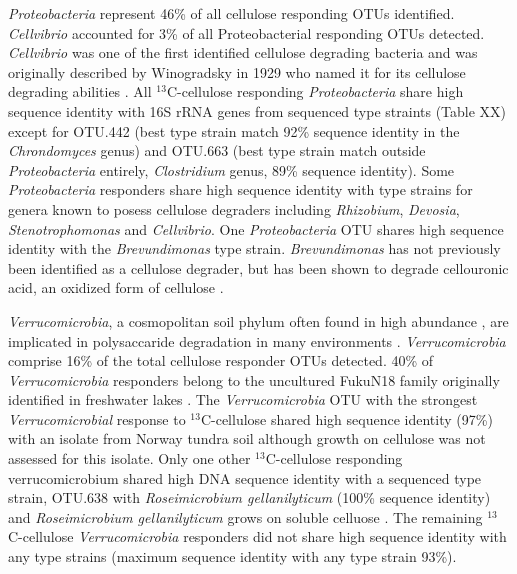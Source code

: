 \textit{Proteobacteria} represent 46\% of all cellulose responding OTUs
identified. \textit{Cellvibrio} accounted for 3\% of all Proteobacterial
responding OTUs detected. \textit{Cellvibrio} was one of the first identified
cellulose degrading bacteria and was originally described by Winogradsky in
1929 who named it for its cellulose degrading abilities
\citep{boone2001bergeys}. All $^{13}$C-cellulose responding
\textit{Proteobacteria} share high sequence identity with 16S rRNA genes from
sequenced type straints (Table XX) except for OTU.442 (best type strain match
92\% sequence identity in the \textit{Chrondomyces} genus) and OTU.663 (best
type strain match outside \textit{Proteobacteria} entirely,
\textit{Clostridium} genus, 89\% sequence identity). Some
\textit{Proteobacteria} responders share high sequence identity with type
strains for genera known to posess cellulose degraders including
\textit{Rhizobium}, \textit{Devosia}, \textit{Stenotrophomonas} and
\textit{Cellvibrio}. One \textit{Proteobacteria} OTU shares high sequence
identity with the \textit{Brevundimonas} type strain. \textit{Brevundimonas}
has not previously been identified as a cellulose degrader, but has been shown
to degrade cellouronic acid, an oxidized form of cellulose
\citep{Tavernier_2008}.

\textit{Verrucomicrobia}, a cosmopolitan soil phylum often found in high
abundance \citep{Fierer_2013}, are implicated in polysaccaride degradation in
many environments \citep{Fierer_2013,Herlemann_2013,10543821}.
\textit{Verrucomicrobia} comprise 16\% of the total cellulose responder OTUs
detected. 40\% of \textit{Verrucomicrobia} responders belong to the uncultured
FukuN18 family originally identified in freshwater lakes \citep{Parveen_2013}.
The \textit{Verrucomicrobia} OTU with the strongest \textit{Verrucomicrobial}
response to $^{13}$C-cellulose shared high sequence identity (97\%) with an
isolate from Norway tundra soil \citep{Jiang_2011} although growth on cellulose
was not assessed for this isolate. Only one other $^{13}$C-cellulose responding
verrucomicrobium shared high DNA sequence identity with a sequenced type
strain, OTU.638 with \textit{Roseimicrobium gellanilyticum} (100\% sequence
identity) and \textit{Roseimicrobium gellanilyticum} grows on soluble celluose
\citep{Otsuka_2012}. The remaining $^{13}$C-cellulose \textit{Verrucomicrobia}
responders did not share high sequence identity with any type strains (maximum
sequence identity with any type strain 93\%). 

